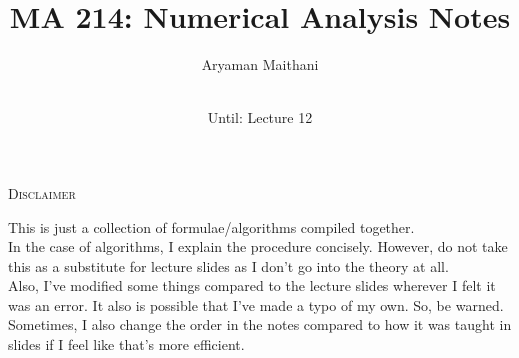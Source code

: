 \documentclass{article}
\title{MA 214: Numerical Analysis Notes}
\author{Aryaman Maithani}
\date{\DTMnow\\
Until: Lecture 12}
\begin{document}
\maketitle
\begin{center}
	\textsc{Disclaimer}
\end{center}
This is just a collection of formulae/algorithms compiled together.\\
In the case of algorithms, I explain the procedure concisely. However, do not take this as a substitute for lecture slides as I don't go into the theory at all.\\
Also, I've modified some things compared to the lecture slides wherever I felt it was an error. It also is possible that I've made a typo of my own. So, be warned.\\
Sometimes, I also change the order in the notes compared to how it was taught in slides if I feel like that's more efficient.

\hrulefill
\end{document}
